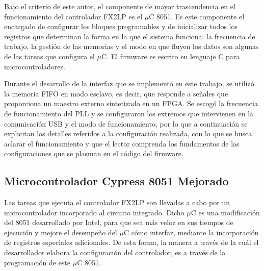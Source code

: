 %
%
%

Bajo el criterio de este autor, el componente de mayor trascendencia en el funcionamiento del controlador FX2LP es el $\mu$C 8051. Es este componente el encargado de configurar los bloques programables y de inicializar todos los registros que determinan la forma en la que el sistema funciona: la frecuencia de trabajo, la gestión de las memorias y el modo en que fluyen los datos son algunas de las tareas que configura el $\mu$C. El firmware es escrito en lenguaje C para microcontroladores. 

Durante el desarrollo de la interfaz que se implementó en este trabajo, se utilizó la memoria FIFO en modo esclavo, es decir, que responde a señales que proporciona un maestro externo sintetizado en un FPGA. Se escogó la frecuencia de funcionamiento del PLL y se configuraron los extremos que intervienen en la comunicación USB y el modo de funcionamiento, por lo que a continuación se explicitan los detalles referidos a la configuración realizada, con lo que se busca aclarar el funcionamiento y que el lector comprenda los fundamentos de las configuraciones que se plasman en el código del firmware.

\subsection{Microcontrolador Cypress 8051 Mejorado}
	Las tareas que ejecuta el controlador FX2LP son llevadas a cabo por un microcontrolador incorporado al circuito integrado. Dicho $\mu$C es una modificación del 8051 desarrollado por Intel, para que sea más veloz en sus tiempos de ejecución y mejore el desempeño del $\mu$C cómo interfaz, mediante la incorporación de registros especiales adicionales.  De esta forma, la manera a través de la cuál el desarrollador elabora la configuración del controlador, es a través de la programación de este $\mu$C 8051.
	
